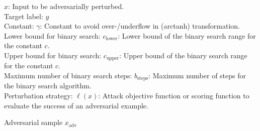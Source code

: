 $x$: Input to be adversarially perturbed. \\
Target label: $y$ \\
Constant: $\gamma$: Constant to avoid over-/underflow in (arctanh) transformation. \\
Lower bound for binary search: $c_{\text{lower}}$: Lower bound of the binary search range for the constant $c$. \\
Upper bound for binary search: $c_{\text{upper}}$: Upper bound of the binary search range for the constant $c$. \\
Maximum number of binary search steps: $b_{\text{steps}}$: Maximum number of steps for the binary search algorithm. \\
Perturbation strategy: $\ell(x)$: Attack objective function or scoring function to evaluate the success of an adversarial example.

Adversarial sample $x_{\text{adv}}$

